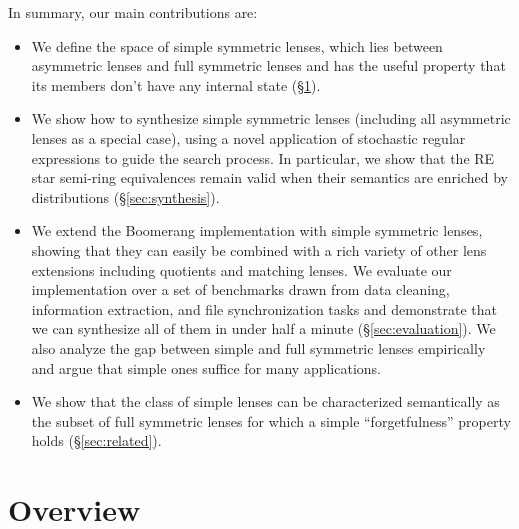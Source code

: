 \documentclass[acmsmall,screen,anonymous]{acmart}
\begin{document}
In summary, our main contributions are:
\begin{itemize}
\item We define the space of simple symmetric lenses, which lies between
  asymmetric lenses and full symmetric lenses and has the useful property that
  its members don't have any internal state (\S\ref{sec:overview}). 
\item We show how to synthesize simple symmetric lenses (including all asymmetric lenses as a special case),
using a novel application of stochastic regular expressions to guide the search process.  In particular, we
show that the RE star semi-ring equivalences remain valid when their semantics
are enriched by distributions (\S\ref{sec:synthesis}).
\item We extend the Boomerang implementation with simple symmetric lenses,
  showing that they can easily be combined with a rich variety of other lens
  extensions including quotients and matching lenses. We evaluate our
  implementation over a set of benchmarks drawn from data cleaning, information
  extraction, and file synchronization tasks and demonstrate that we can
  synthesize all of them in under half a minute (\S\ref{sec:evaluation}).
%
  We also analyze the gap between simple and full symmetric lenses
  empirically and argue that simple ones suffice for many applications.
\item We show that the class of simple lenses can be characterized
  semantically as the subset of full symmetric lenses for which a simple
  ``forgetfulness'' property holds (\S\ref{sec:related}).  
\end{itemize}


\noindent


\section{Overview}
\label{sec:overview}
\end{document}
